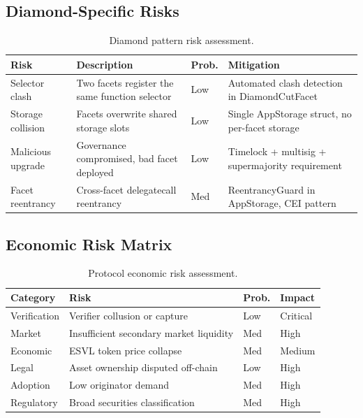 \documentclass[11pt,a4paper]{article}
\begin{document}
\subsection{Diamond-Specific Risks}

\begin{table}[H]
\centering
\caption{Diamond pattern risk assessment.}
\begin{tabularx}{\textwidth}{lXll}
\toprule
\textbf{Risk} & \textbf{Description} & \textbf{Prob.} & \textbf{Mitigation} \\
\midrule
Selector clash & Two facets register the same function selector & Low & Automated clash detection in DiamondCutFacet \\
Storage collision & Facets overwrite shared storage slots & Low & Single AppStorage struct, no per-facet storage \\
Malicious upgrade & Governance compromised, bad facet deployed & Low & Timelock + multisig + supermajority requirement \\
Facet reentrancy & Cross-facet delegatecall reentrancy & Med & ReentrancyGuard in AppStorage, CEI pattern \\
\bottomrule
\end{tabularx}
\end{table}

\subsection{Economic Risk Matrix}

\begin{table}[H]
\centering
\caption{Protocol economic risk assessment.}
\begin{tabularx}{\textwidth}{lXll}
\toprule
\textbf{Category} & \textbf{Risk} & \textbf{Prob.} & \textbf{Impact} \\
\midrule
Verification & Verifier collusion or capture & Low & Critical \\
Market & Insufficient secondary market liquidity & Med & High \\
Economic & ESVL token price collapse & Med & Medium \\
Legal & Asset ownership disputed off-chain & Low & High \\
Adoption & Low originator demand & Med & High \\
Regulatory & Broad securities classification & Med & High \\
\bottomrule
\end{tabularx}
\end{table}
\end{document}
